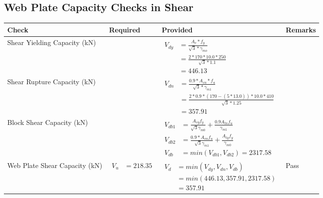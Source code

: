 \documentclass{article}%
\begin{document}
\subsection{Web Plate Capacity Checks in Shear}%
\label{subsec:WebPlateCapacityChecksinShear}%
\renewcommand{\arraystretch}{1.2}%
\begin{longtable}{|p{4cm}|p{4cm}|p{7cm}|p{1.5cm}|}%
\hline%
\rowcolor{OsdagGreen}%
Check&Required&Provided&Remarks\\%
\hline%
\endhead%
\hline%
Shear Yielding Capacity (kN)&&$\begin{aligned} V_{dy} &= \frac{A_v*f_y}{\sqrt{3}*\gamma_{mo}}\\ &=\frac{2*170*10.0*250}{\sqrt{3}*1.1}\\ &=446.13\end{aligned}$&\\%
\hline%
Shear Rupture Capacity (kN)&&$\begin{aligned} V_{dn} &= \frac{0.9*A_{vn}*f_u}{\sqrt{3}*\gamma_{m1}}\\ &= \frac{2*0.9 *(170-(5*13.0))*10.0*410}{\sqrt{3}*1.25}\\ &=357.91\end{aligned}$&\\%
\hline%
Block Shear Capacity (kN)&&$\begin{aligned}V_{db1} &= \frac{A_{vg} f_{y}}{\sqrt{3} \gamma_{m0}} + \frac{0.9 A_{tn} f_{u}}{\gamma_{m1}}\\ V_{db2} &= \frac{0.9*A_{vn} f_{u}}{\sqrt{3} \gamma_{m1}} + \frac{A_{tg} f_{y}}{\gamma_{m0}}\\ V_{db} &= min(V_{db1}, V_{db2})= 2317.58\end{aligned}$&\\%
\hline%
Web Plate Shear Capacity (kN)&$\begin{aligned} V_u &=218.35\end{aligned}$&$\begin{aligned} V_d &= min(V_{dy},V_{dn},V_{db})\\ &= min(446.13,357.91,2317.58)\\ &=357.91\end{aligned}$&Pass\\%
\hline%
\end{longtable}

%
%
\newpage%
\end{document}

